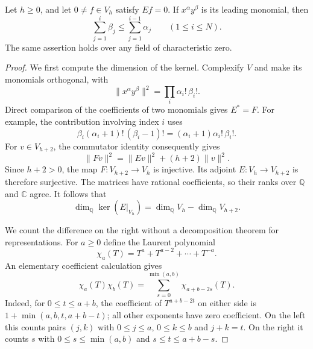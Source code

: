 \begin{lemma}\label{sm-two-column}
Let $h\ge0$, and let $0\ne f\in V_h$ satisfy $Ef=0$.
If $x^\alpha y^\beta$ is its leading monomial, then
\begin{equation}\label{sm-ballot}
                \sum_{j=1}^i\beta_j
                    \le\sum_{j=1}^{i-1}\alpha_j
                    \qquad(1\le i\le N).
\end{equation}
The same assertion holds over any field of characteristic zero.
\end{lemma}
\begin{proof}
We first compute the dimension of the kernel. Complexify $V$ and make
its monomials orthogonal, with
\[
                \|x^\alpha y^\beta\|^2
                           =\prod_i\alpha_i!\,\beta_i!.
\]
Direct comparison of the coefficients of two monomials gives
$E^*=F$. For example, the contribution involving index $i$ uses
\[
 \beta_i(\alpha_i+1)!\,(\beta_i-1)!
                  =(\alpha_i+1)\alpha_i!\,\beta_i!.
\]
For $v\in V_{h+2}$, the commutator identity consequently gives
\[
            \|Fv\|^2=\|Ev\|^2+(h+2)\|v\|^2.
\]
Since $h+2>0$, the map $F:V_{h+2}\longrightarrow V_h$ is
injective. Its adjoint $E:V_h\longrightarrow V_{h+2}$ is therefore
surjective. The matrices have rational coefficients, so their ranks
over $\mathbb Q$ and $\mathbb C$ agree. It follows that
\begin{equation}\label{sm-kernel-dimension}
       \dim_{\mathbb Q}\ker(E|_{V_h})
                       =\dim_{\mathbb Q}V_h-\dim_{\mathbb Q}V_{h+2}.
\end{equation}

We count the difference on the right without a decomposition theorem
for representations. For $a\ge0$ define the Laurent polynomial
\[
                     \chi_a(T)=T^a+T^{a-2}+\cdots+T^{-a}.
\]
An elementary coefficient calculation gives
\begin{equation}\label{sm-character-product}
              \chi_a(T)\chi_b(T)
                 =\sum_{s=0}^{\min(a,b)}\chi_{a+b-2s}(T).
\end{equation}
Indeed, for $0\le t\le a+b$, the coefficient of $T^{a+b-2t}$
on either side is $1+\min(a,b,t,a+b-t)$; all other exponents have
zero coefficient. On the left this counts pairs $(j,k)$ with
$0\le j\le a$, $0\le k\le b$ and $j+k=t$. On the right it
counts $s$ with $0\le s\le\min(a,b)$ and $s\le t\le a+b-s$.


\end{proof}

